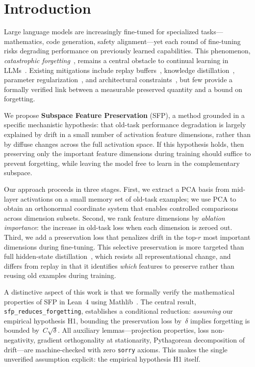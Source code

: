 \section{Introduction}
\label{sec:introduction}

Large language models are increasingly fine-tuned for specialized tasks---mathematics, code generation, safety alignment---yet each round of fine-tuning risks degrading performance on previously learned capabilities.
This phenomenon, \emph{catastrophic forgetting}~\citep{mccloskey1989catastrophic, french1999catastrophic}, remains a central obstacle to continual learning in LLMs~\citep{delange2021continual}.
Existing mitigations include replay buffers~\citep{chaudhry2019tiny}, knowledge distillation~\citep{li2017learning}, parameter regularization~\citep{kirkpatrick2017overcoming}, and architectural constraints~\citep{qin2024exploring}, but few provide a formally verified link between a measurable preserved quantity and a bound on forgetting.

We propose \textbf{Subspace Feature Preservation} (SFP), a method grounded in a specific mechanistic hypothesis: that old-task performance degradation is largely explained by drift in a small number of activation feature dimensions, rather than by diffuse changes across the full activation space.
If this hypothesis holds, then preserving only the important feature dimensions during training should suffice to prevent forgetting, while leaving the model free to learn in the complementary subspace.

Our approach proceeds in three stages.
First, we extract a PCA basis from mid-layer activations on a small memory set of old-task examples; we use PCA to obtain an orthonormal coordinate system that enables controlled comparisons across dimension subsets.
Second, we rank feature dimensions by \emph{ablation importance}: the increase in old-task loss when each dimension is zeroed out.
Third, we add a preservation loss that penalizes drift in the top-$r$ most important dimensions during fine-tuning.
This selective preservation is more targeted than full hidden-state distillation~\citep{douillard2020podnet}, which resists all representational change, and differs from replay in that it identifies \emph{which} features to preserve rather than reusing old examples during training.

A distinctive aspect of this work is that we formally verify the mathematical properties of SFP in Lean~4 using Mathlib~\citep{mathlib2020}.
The central result, \texttt{sfp\_reduces\_forgetting}, establishes a conditional reduction: \emph{assuming} our empirical hypothesis H1, bounding the preservation loss by~$\delta$ implies forgetting is bounded by~$C\sqrt{\delta}$.
All auxiliary lemmas---projection properties, loss non-negativity, gradient orthogonality at stationarity, Pythagorean decomposition of drift---are machine-checked with zero \texttt{sorry} axioms.
This makes the single unverified assumption explicit: the empirical hypothesis H1 itself.

